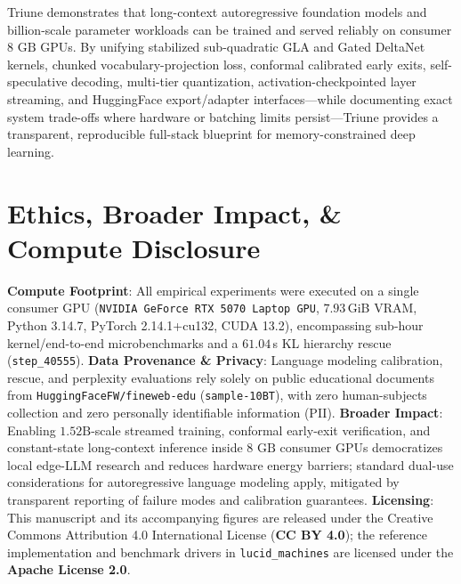 \documentclass[10pt,twocolumn,letterpaper]{article}
\begin{document}
Triune demonstrates that long-context autoregressive foundation models and billion-scale parameter workloads can be trained and served reliably on consumer $8\text{ GB}$ GPUs. By unifying stabilized sub-quadratic GLA and Gated DeltaNet kernels, chunked vocabulary-projection loss, conformal calibrated early exits, self-speculative decoding, multi-tier quantization, activation-checkpointed layer streaming, and HuggingFace export/adapter interfaces---while documenting exact system trade-offs where hardware or batching limits persist---Triune provides a transparent, reproducible full-stack blueprint for memory-constrained deep learning.

\section*{Ethics, Broader Impact, \& Compute Disclosure}

\textbf{Compute Footprint}: All empirical experiments were executed on a single consumer GPU (\texttt{NVIDIA GeForce RTX 5070 Laptop GPU}, $7.93$\,GiB VRAM, Python 3.14.7, PyTorch 2.14.1+cu132, CUDA 13.2), encompassing sub-hour kernel/end-to-end microbenchmarks and a $61.04$\,s KL hierarchy rescue (\texttt{step\_40555}).
\textbf{Data Provenance \& Privacy}: Language modeling calibration, rescue, and perplexity evaluations rely solely on public educational documents from \texttt{HuggingFaceFW/fineweb-edu} (\texttt{sample-10BT}), with zero human-subjects collection and zero personally identifiable information (PII).
\textbf{Broader Impact}: Enabling $1.52\text{B}$-scale streamed training, conformal early-exit verification, and constant-state long-context inference inside $8\text{ GB}$ consumer GPUs democratizes local edge-LLM research and reduces hardware energy barriers; standard dual-use considerations for autoregressive language modeling apply, mitigated by transparent reporting of failure modes and calibration guarantees.
\textbf{Licensing}: This manuscript and its accompanying figures are released under the Creative Commons Attribution 4.0 International License (\textbf{CC BY 4.0}); the reference implementation and benchmark drivers in \texttt{lucid\_machines} are licensed under the \textbf{Apache License 2.0}.



\end{document}
